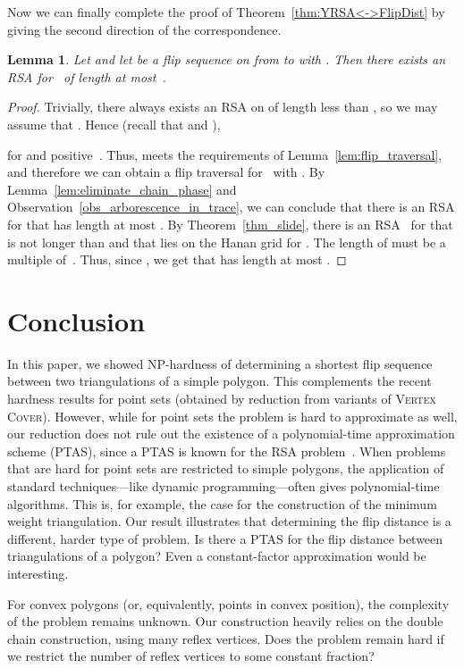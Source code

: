 \documentclass[a4paper,11pt]{article}
\newtheorem{lemma}[theorem]{Lemma}
\newcommand{\qedopt}{}
\begin{document}
\noindent
Now we can finally complete the proof of Theorem~\ref{thm:YRSA<->FlipDist} by giving the second direction of the correspondence.

\begin{lemma}\label{lem:flip_tour->YRTSP}
Let  and
let  be a flip sequence on  from  to
 with .
Then there exists an RSA for~ of length at most~.
\end{lemma}
\begin{proof}
Trivially, there always exists an RSA on  of length less than , so we may assume that 
.  Hence (recall that  and ),
 
for  and positive~.
Thus,  meets the requirements of Lemma~\ref{lem:flip_traversal}, and therefore
we can obtain a flip traversal  for~ with .
By Lemma~\ref{lem:eliminate_chain_phase} and Observation~\ref{obs_arborescence_in_trace},
we can conclude that there is an RSA  for  
that has length at most . 
By Theorem~\ref{thm_slide}, there is an RSA~ for  that is not 
longer than  and that lies on 
the Hanan grid for . The length of  must be a multiple of~.
Thus, since , we get that  has length at most .
\qedopt
\end{proof}

\section{Conclusion}
In this paper, we showed NP-hardness of determining a shortest flip sequence between two triangulations of a simple polygon.
This complements the recent hardness results for point sets (obtained by reduction from variants of \textsc{Vertex Cover}).
However, while for point sets the problem is hard to approximate as well, our reduction does not rule out the existence of a polynomial-time approximation
scheme (PTAS), since a PTAS is known for the RSA problem~\cite{rsa_ptas}.
When problems that are hard for point sets are restricted to simple polygons, the application of standard techniques---like dynamic programming---often gives polynomial-time algorithms.
This is, for example, the case for the construction of the minimum weight triangulation.
Our result illustrates that determining the flip distance is a different, harder type of problem.
Is there a PTAS for the flip distance between triangulations of a polygon?
Even a constant-factor approximation would be interesting.

For convex polygons (or, equivalently, points in convex position), the complexity of the problem remains unknown.
Our construction heavily relies on the double chain construction, using many reflex vertices.
Does the problem remain hard if we restrict the number of reflex vertices to some constant fraction?
\end{document}
